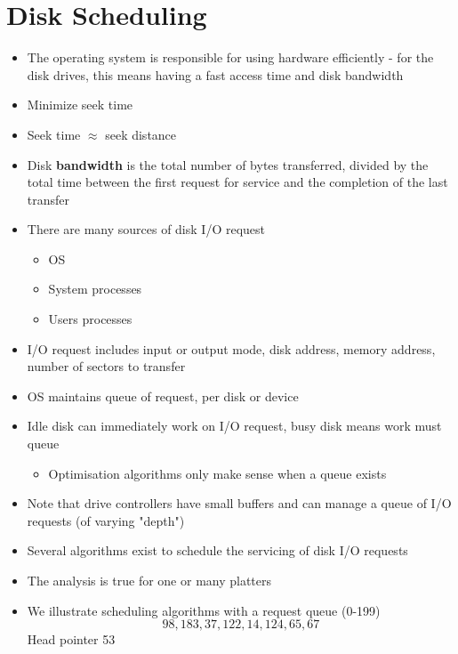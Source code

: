 \documentclass{article}[18pt]
\begin{document}
\section{Disk Scheduling}
\begin{itemize}
	\item The operating system is responsible for using hardware efficiently - for the disk drives, this means having a fast access time and disk bandwidth
	\item Minimize seek time
	\item Seek time $\approx$ seek distance
	\item Disk \textbf{bandwidth} is the total number of bytes transferred, divided by the total time between the first request for service and the completion of the last transfer
	\item There are many sources of disk I/O request
	\begin{itemize}
		\item OS
		\item System processes
		\item Users processes
	\end{itemize}
	\item I/O request includes input or output mode, disk address, memory address, number of sectors to transfer
	\item OS maintains queue of request, per disk or device
	\item Idle disk can immediately work on I/O request, busy disk means work must queue
	\begin{itemize}
		\item Optimisation algorithms only make sense when a queue exists
	\end{itemize}
	\item Note that drive controllers have small buffers and can manage a queue of I/O requests (of varying "depth")
	\item Several algorithms exist to schedule the servicing of disk I/O requests
	\item The analysis is true for one or many platters
	\item We illustrate scheduling algorithms with a request queue (0-199)
	$$98,183,37,122,14,124,65,67$$
	Head pointer 53
\end{itemize}
\end{document}
